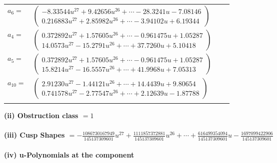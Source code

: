 \documentclass[1p]{elsarticle_modified}
\theoremstyle{definition}
\begin{document}
\begin{tabular}{m{7pt} m{180pt} m{7pt} m{180pt} }
\flushright $a_{6}=$&$\begin{pmatrix}-8.33544 u^{27}+9.42656 u^{26}+\cdots-28.3241 u-7.08146\\0.216883 u^{27}+2.85982 u^{26}+\cdots-3.94102 u+6.19344\end{pmatrix}$ \\
\flushright $a_{4}=$&$\begin{pmatrix}0.372892 u^{27}+1.57605 u^{26}+\cdots-0.961475 u+1.05287\\14.0573 u^{27}-15.2791 u^{26}+\cdots+37.7260 u+5.10418\end{pmatrix}$ \\
\flushright $a_{5}=$&$\begin{pmatrix}0.372892 u^{27}+1.57605 u^{26}+\cdots-0.961475 u+1.05287\\15.8214 u^{27}-16.5557 u^{26}+\cdots+41.9968 u+7.05313\end{pmatrix}$ \\
\flushright $a_{10}=$&$\begin{pmatrix}2.91230 u^{27}-1.44121 u^{26}+\cdots+14.4439 u+9.80654\\0.741578 u^{27}-2.77547 u^{26}+\cdots+2.12639 u-1.87788\end{pmatrix}$\\&\end{tabular}
\flushleft \textbf{(ii) Obstruction class $= 1$}\\~\\
\flushleft \textbf{(iii) Cusp Shapes $= -\frac{1086730167949}{145137309601} u^{27}+\frac{1111857372881}{145137309601} u^{26}+\cdots+\frac{616499354094}{145137309601} u-\frac{1697099422906}{145137309601}$}\\~\\
\newpage\renewcommand{\arraystretch}{1}
\flushleft \textbf{(iv) u-Polynomials at the component}\newline \\
\end{document}
